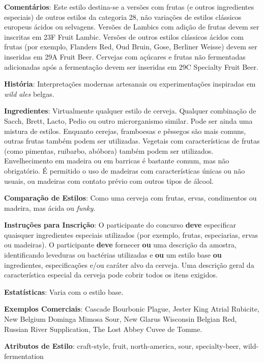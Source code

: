 \textbf{Comentários}: Este estilo destina-se a versões com frutas (e outros ingredientes especiais) de outros estilos da categoria 28, não variações de estilos clássicos europeus ácidos ou selvagens. Versões de Lambics com adição de frutas devem ser inscritas em 23F Fruit Lambic. Versões de outros estilos clássicos ácidos com frutas (por exemplo, Flanders Red, Oud Bruin, Gose, Berliner Weisse) devem ser inseridas em 29A Fruit Beer. Cervejas com açúcares e frutas não fermentadas adicionadas após a fermentação devem ser inseridas em 29C Specialty Fruit Beer.

\textbf{História}: Interpretações modernas artesanais ou experimentações inspiradas em \textit{wild ales} belgas.

\textbf{Ingredientes}: Virtualmente qualquer estilo de cerveja. Qualquer combinação de Sacch, Brett, Lacto, Pedio ou outro microrganismo similar. Pode ser ainda uma mistura de estilos. Enquanto cerejas, framboesas e pêssegos são mais comuns, outras frutas também podem ser utilizadas. Vegetais com características de frutas (como pimentas, ruibarbo, abóbora) também podem ser utilizados. Envelhecimento em madeira ou em barricas é bastante comum, mas não obrigatório. É permitido o uso de madeiras com características únicas ou não usuais, ou madeiras com contato prévio com outros tipos de álcool.

\textbf{Comparação de Estilos}: Como uma cerveja com frutas, ervas, condimentos ou madeira, mas ácida ou \textit{funky}.

\textbf{Instruções para Inscrição}: O participante do concurso \textbf{deve} especificar quaisquer ingredientes especiais utilizados (por exemplo, frutas, especiarias, ervas ou madeiras). O participante \textbf{deve} fornecer \textbf{ou} uma descrição da amostra, identificando leveduras ou bactérias utilizadas e \textbf{ou} um estilo base \textbf{ou} ingredientes, especificações e/ou caráter alvo da cerveja. Uma descrição geral da característica especial da cerveja pode cobrir todos os itens exigidos.

\textbf{Estatísticas}: Varia com o estilo base.

\textbf{Exemplos Comerciais}: Cascade Bourbonic Plague, Jester King Atrial Rubicite, New Belgium Dominga Mimosa Sour, New Glarus Wisconsin Belgian Red, Russian River Supplication, The Lost Abbey Cuvee de Tomme.

\textbf{Atributos de Estilo}: craft-style, fruit, north-america, sour, specialty-beer, wild-fermentation
